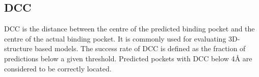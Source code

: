 \documentclass[journal=jcisd8,manuscript=article]{achemso}
\begin{document}
\subsection{DCC}
DCC is the distance between the centre of the predicted binding pocket and the centre of the actual binding pocket. It is commonly used for evaluating 3D-structure based models. The success rate of DCC is defined as the fraction of predictions below a given threshold. Predicted pockets with DCC below 4{\AA} are considered to be correctly located.





\end{document}
